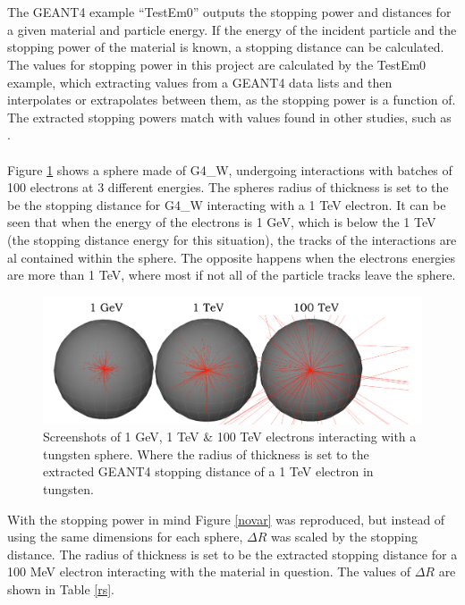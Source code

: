 \documentclass[12pt,a4paper]{article}
\begin{document}
\\\\
\noindent The GEANT4 example ``TestEm0'' \cite{emo} outputs the stopping power and distances for a given material and particle energy. If the energy of the incident particle and the stopping power of the material is known, a stopping distance can be calculated. The values for stopping power in this project are calculated by the TestEm0 example, which extracting values from a GEANT4 data lists and then interpolates or extrapolates between them, as the stopping power is a function of. The extracted stopping powers match with values found in other studies, such as \cite{stpdat}.
\\\\
Figure \ref{tung} shows a sphere made of G4\_W, undergoing interactions with batches of 100 electrons at 3 different energies. The spheres radius of thickness is set to the be the stopping distance for G4\_W interacting with a 1 TeV electron. It can be seen that when the energy of the electrons is 1 GeV, which is below the 1 TeV (the stopping distance energy for this situation), the tracks of the interactions are al contained within the sphere. The opposite happens when the electrons energies are more than 1 TeV, where most if not all of the particle tracks leave the sphere. 

\begin{figure}[h!]
\hspace*{1.4cm}\includegraphics[scale=0.5]{Images//BDSIM//Tungsten_Sphere.png}
\caption[width=\columnwidth]{Screenshots of 1 GeV, 1 TeV \& 100 TeV electrons interacting with a tungsten sphere. Where the radius of thickness is set to the extracted GEANT4 stopping distance of a 1 TeV electron in tungsten.}
\label{tung}
\end{figure}

\noindent With the stopping power in mind Figure \ref{novar} was reproduced, but instead of using the same dimensions for each sphere, $\Delta R$ was scaled by the stopping distance. The radius of thickness is set to be the extracted stopping distance for a 100 MeV electron interacting with the material in question. The values of $\Delta R$ are shown in Table \ref{rs}.
\end{document}
